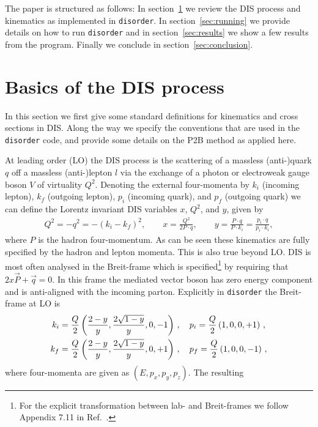 \documentclass[submission, PhysCodeb]{SciPost_better_arXiv}
\newcommand{\disorder}{{\tt disorder}}
\begin{document}
The paper is structured as follows: In section~\ref{sec:dis} we review
the DIS process and kinematics as implemented in \disorder{}. In
section~\ref{sec:running} we provide details on how to run \disorder{}
and in section~\ref{sec:results} we show a few results from the
program. Finally we conclude in section~\ref{sec:conclusion}.

\section{Basics of the DIS process}
\label{sec:dis}
In this section we first give some standard definitions for kinematics
and cross sections in DIS. Along the way we specify the conventions
that are used in the \disorder{} code, and provide some details on the
P2B method as applied here.

At leading order (LO) the DIS process is
the scattering of a massless (anti-)quark $q$ off a massless
\mbox{(anti-)lepton} $l$ via the exchange of a photon or electroweak
gauge boson $V$ of virtuality $Q^2$. Denoting the external
four-momenta by $k_i$ (incoming lepton), $k_f$ (outgoing lepton),
$p_i$ (incoming quark), and $p_f$ (outgoing quark) we can define the
Lorentz invariant DIS variables $x$, $Q^2$, and $y$, given by
\begin{align}
  Q^2 = -q^2 = -(k_i - k_f)^2, \qquad  x = \frac{Q^2}{2 P \cdot q},
  \qquad  y = \frac{P \cdot q}{P \cdot k_i} = \frac{p_i \cdot q}{p_i \cdot k_i} ,
  \label{eq:dis-variables}
\end{align}
where $P$ is the hadron four-momentum. As can be seen these kinematics
are fully specified by the hadron and lepton momenta. This is also
true beyond LO. DIS is most often analysed in the Breit-frame
which is specified\footnote{For the explicit transformation between
lab- and Breit-frames we follow Appendix 7.11 in
Ref.~\cite{Devenish:2004pb}.}  by requiring that $2 x \vec{P} +
\vec{q} = 0$. In this frame the mediated vector boson has zero energy
component and is anti-aligned with the incoming parton. Explicitly in
\disorder{} the Breit-frame at LO is
\begin{align}
  \label{eq:BreitLO}
k_i &= \frac{Q}{2}\left(\frac{2-y}{y},\frac{2\sqrt{1-y}}{y},0,-1 \right)\,, \quad  p_i = \frac{Q}{2}\left(1,0,0,+1 \right)\,, \\ \notag
k_f &= \frac{Q}{2}\left(\frac{2-y}{y},\frac{2\sqrt{1-y}}{y},0,+1 \right)\,, \quad  p_f = \frac{Q}{2}\left(1,0,0,-1 \right)\,, 
\end{align}
where four-momenta are given as $(E,p_x,p_y,p_z)$. The resulting
\end{document}
